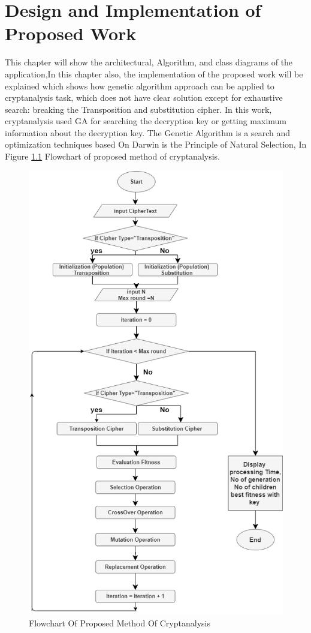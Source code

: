 \chapter{Design and Implementation of Proposed Work}
This chapter will show the architectural, Algorithm, and class diagrams of the application,In this chapter also, the implementation of the proposed work will be explained which shows how genetic algorithm approach can be applied to cryptanalysis task, which does not have clear solution except for exhaustive search: breaking the Transposition and substitution cipher.
In this work, cryptanalysis used GA for searching the decryption key or getting maximum information about the decryption key. The Genetic Algorithm is a search and optimization techniques based On Darwin is the Principle of Natural Selection,
In Figure \ref{Cryptanalysis_flow} Flowchart of proposed method of cryptanalysis.
\begin{figure}[ht]
	\centering
	\includegraphics[width=.8\textwidth]{imagenes/FlowChartOfCry.png}
    \caption{Flowchart Of Proposed Method Of Cryptanalysis}
    \label{Cryptanalysis_flow}
\end{figure}
